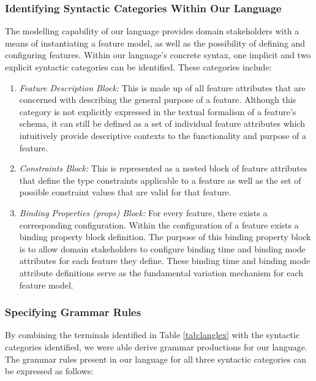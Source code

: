 \documentclass[conference]{IEEEtran}
\begin{document}
\subsubsection{Identifying Syntactic Categories Within Our Language}
The modelling capability of our language provides domain stakeholders with a means of instantiating a feature model, as well as the possibility of defining and configuring features. Within our language's concrete syntax, one implicit and two explicit syntactic categories can be identified. These categories include:
\begin{enumerate}
    \item \textit{Feature Description Block:} This is made up of all feature attributes that are concerned with describing the general purpose of a feature. Although this category is not explicitly expressed in the textual formalism of a feature's schema, it can still be defined as a set of individual feature attributes which intuitively provide descriptive contexts to the functionality and purpose of a feature.
    \item \textit{Constraints Block:} This is represented as a nested block of feature attributes that define the type constraints applicable to a feature as well as the set of possible constraint values that are valid for that feature.
    \item \textit{Binding Properties (props) Block:} For every feature, there exists a corresponding configuration. Within the configuration of a feature exists a binding property block definition. The purpose of this binding property block is to allow domain stakeholders to configure binding time and binding mode attributes for each feature they define. These binding time and binding mode attribute definitions serve as the fundamental variation mechanism for each feature model.
\end{enumerate}
 
\subsubsection{Specifying Grammar Rules} By combining the terminals identified in Table \ref{tab:langlex} with the syntactic categories identified, we were able derive grammar productions for our language. The grammar rules present in our language for all three syntactic categories can be expressed as follows:\\
\end{document}
